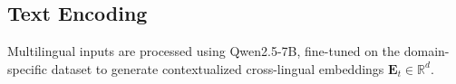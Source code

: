 








\subsection{Text Encoding}
Multilingual inputs are processed using Qwen2.5-7B, 
fine-tuned on the domain-specific dataset to generate 
contextualized cross-lingual embeddings 
$\mathbf{E}_t \in \mathbb{R}^{d}$.

